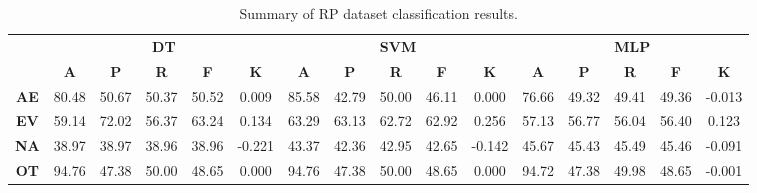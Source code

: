 \begin{landscape}
\begin{table}[htbp]
\footnotesize
\centering
\caption{Summary of RP dataset classification results.}
\label{tab:base_female}
\begin{tabular}{|c|c|c|c|c|c|c|c|c|c|c|c|c|c|c|c|}
\hline
\multirow{2}{*}{}	& \multicolumn{5}{c|}{\textbf{DT}}												& \multicolumn{5}{c|}{\textbf{SVM}}												& \multicolumn{5}{c|}{\textbf{MLP}}												\\ \cline{2-16} 
					& \textbf{A}	& \textbf{P}	& \textbf{R}	& \textbf{F}	& \textbf{K}	& \textbf{A}	& \textbf{P}	& \textbf{R}	& \textbf{F}	& \textbf{K}	& \textbf{A}	& \textbf{P}	& \textbf{R}	& \textbf{F}	& \textbf{K}	\\ \hline
\textbf{AE}			& 80.48			& 50.67			& 50.37			& 50.52			& 0.009			& 85.58			& 42.79			& 50.00			& 46.11			& 0.000			& 76.66			& 49.32			& 49.41			& 49.36			& -0.013			\\ \hline
\textbf{EV}			& 59.14			& 72.02			& 56.37			& 63.24			& 0.134			& 63.29			& 63.13			& 62.72			& 62.92			& 0.256			& 57.13			& 56.77			& 56.04			& 56.40			& 0.123			\\ \hline
\textbf{NA}			& 38.97			& 38.97			& 38.96			& 38.96			& -0.221			& 43.37			& 42.36			& 42.95			& 42.65			& -0.142			& 45.67			& 45.43			& 45.49			& 45.46			& -0.091			\\ \hline
\textbf{OT}			& 94.76			& 47.38			& 50.00			& 48.65			& 0.000			& 94.76			& 47.38			& 50.00			& 48.65			& 0.000			& 94.72			& 47.38			& 49.98			& 48.65			& -0.001			\\ \hline
\end{tabular}
\end{table}
\end{landscape}